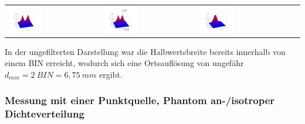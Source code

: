              \begin{tabular}{p{4.5cm}p{4.5cm}p{4.5cm}c}
                                          \includegraphics[width=0.375\textwidth, height=0.2\textheight]{pic/3dplotAufloes3.png}
                                         & 
                                          \includegraphics[width=0.375\textwidth, height=0.2\textheight]{pic/3dplotAufloes2.png}
                                         &
                                          \includegraphics[width=0.375\textwidth, height=0.2\textheight]{pic/3dplotAufloes1.png} \\               
                          
             \end{tabular}
             \label{dfd:Auflösung}
             \vspace{3mm}
             
             In der ungefilterten Darstellung war die Halbwertsbreite bereits innerhalb von einem BIN erreicht, wodurch sich eine Ortsauflösung von ungefähr $d_{min} = 2\ \unit{BIN} = 6,75\ \unit{mm}$ ergibt.
            
              
                   
        \subsubsection{Messung mit einer Punktquelle, Phantom an-/isotroper Dichteverteilung}
        
